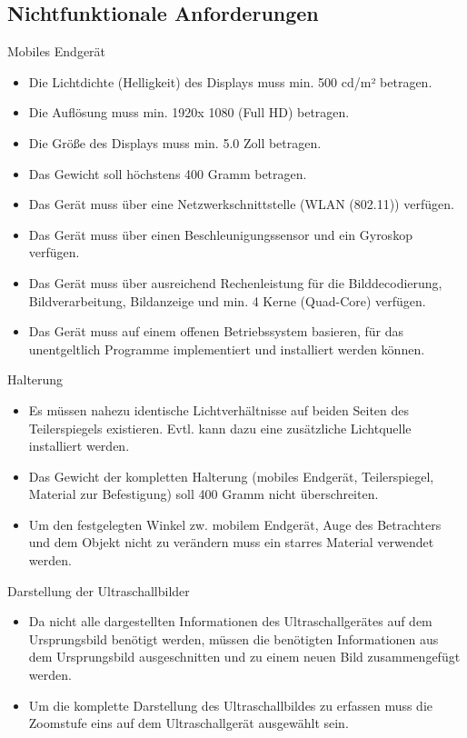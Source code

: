 \subsection{Nichtfunktionale Anforderungen}
\begin{minipage}{\textwidth}
Mobiles Endgerät
\begin{itemize}
\item Die Lichtdichte (Helligkeit) des Displays muss min. 500 cd/m² betragen.
\item Die Auflösung muss min. 1920x 1080 (Full HD) betragen.
\item Die Größe des Displays muss min. 5.0 Zoll betragen.
\item Das Gewicht soll höchstens 400 Gramm betragen.
\item Das Gerät muss über eine Netzwerkschnittstelle (WLAN (802.11)) verfügen.
\item Das Gerät muss über einen Beschleunigungssensor und ein Gyroskop verfügen.
\item Das Gerät muss über ausreichend Rechenleistung für die Bilddecodierung, Bildverarbeitung, Bildanzeige und min. 4 Kerne (Quad-Core) verfügen.
\item Das Gerät muss auf einem offenen Betriebssystem basieren, für das unentgeltlich Programme implementiert und installiert werden können.
\end{itemize}
\end{minipage}

\begin{minipage}{\textwidth}
Halterung
\begin{itemize}
\item Es müssen nahezu identische Lichtverhältnisse auf beiden Seiten des Teilerspiegels existieren. Evtl. kann dazu eine zusätzliche Lichtquelle installiert werden.
\item Das Gewicht der kompletten Halterung (mobiles Endgerät, Teilerspiegel, Material zur Befestigung)  soll 400 Gramm nicht überschreiten.
\item Um den festgelegten Winkel zw. mobilem Endgerät, Auge des Betrachters und dem Objekt nicht zu verändern muss ein starres Material verwendet werden.
\end{itemize}
\end{minipage}

\begin{minipage}{\textwidth}
Darstellung der Ultraschallbilder
\begin{itemize}
\item Da nicht alle dargestellten Informationen des Ultraschallgerätes auf dem Ursprungsbild benötigt werden, müssen die benötigten Informationen aus dem Ursprungsbild ausgeschnitten und zu einem neuen Bild zusammengefügt werden.
\item Um die komplette Darstellung des Ultraschallbildes zu erfassen muss die Zoomstufe eins auf dem Ultraschallgerät ausgewählt sein.
\end{itemize}
\end{minipage}
